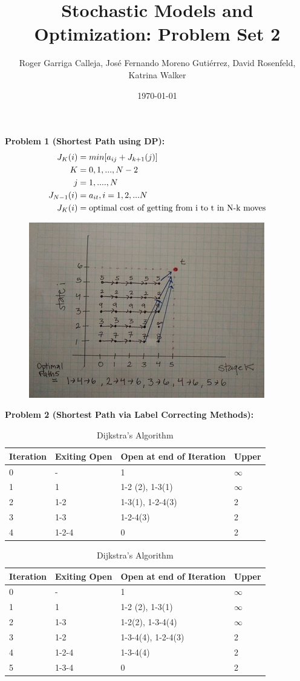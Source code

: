 \documentclass[11pt, english]{article}
\title{Stochastic Models and Optimization: Problem Set 2}
\author{Roger Garriga Calleja, José Fernando Moreno Gutiérrez, David Rosenfeld, Katrina Walker}
\date{\today}
\begin{document}
\maketitle
\textbf{Problem 1 (Shortest Path using DP):}
\\
\begin{align*}
J_K(i) &= min[a_{ij} + J_{k+1}(j)]\\
K & = 0, 1,...,N-2\\
j & = 1,....,N \\
J_{N-1}(i) & = a_{it}, i = 1, 2,...N \\
J_{K}(i)& = \textup{optimal cost of getting from i to t in N-k moves} 
\end{align*}
\begin{center}
\begin{figure}[h]\small
	\centering
	\includegraphics[width=0.7\linewidth]{DP_graph}
\end{figure}
\end{center}
\clearpage
\textbf{Problem 2 (Shortest Path via Label Correcting Methods):}
\begin{table}[h]\small
	\centering
	\caption{Bellman Ford Algorithm}
	\label{my-label}
	\begin{tabular}{llll}
		\hline
		Iteration & Exiting Open & Open at end of Iteration & Upper \\ \hline
		0 & - & 1 & $\infty$ \\ \hline
		1 & 1 & 1-2 (2), 1-3(1) & $\infty$ \\ \hline
		2 & 1-2 & 1-3(1), 1-2-4(3) & 2 \\ \hline
		3 & 1-3 & 1-2-4(3) & 2 \\ \hline
		4 & 1-2-4 & 0 & 2 \\ \hline
	\end{tabular}
	\centering
	\caption{Dijkstra’s Algorithm}
	\label{my-label}
	\begin{tabular}{llll}
		\hline
		Iteration & Exiting Open & Open at end of Iteration & Upper \\ \hline
		0 & - & 1 & $\infty$ \\ \hline
		1 & 1 & 1-2 (2), 1-3(1) & $\infty$ \\ \hline
		2 & 1-3 & 1-2(2),  1-3-4(4) & $\infty$ \\ \hline
		3 & 1-2 & 1-3-4(4), 1-2-4(3) & 2 \\ \hline
		4 & 1-2-4 & 1-3-4(4) & 2 \\ \hline
		5 & 1-3-4 & 0 & 2 \\ \hline
	\end{tabular}
\end{table}
\end{document}
